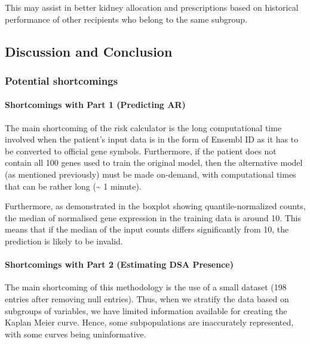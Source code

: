\documentclass[a4paper,9pt,twocolumn,twoside,]{pinp}
\begin{document}
This may assist in better kidney allocation and prescriptions based on
historical performance of other recipients who belong to the same
subgroup.

\newpage

\hypertarget{discussion-and-conclusion}{%
\subsection{Discussion and Conclusion}\label{discussion-and-conclusion}}

\hypertarget{potential-shortcomings}{%
\subsubsection{Potential shortcomings}\label{potential-shortcomings}}

\hypertarget{shortcomings-with-part-1-predicting-ar}{%
\paragraph{Shortcomings with Part 1 (Predicting
AR)}\label{shortcomings-with-part-1-predicting-ar}}

The main shortcoming of the risk calculator is the long computational
time involved when the patient's input data is in the form of Ensembl ID
as it has to be converted to official gene symbols. Furthermore, if the
patient does not contain all 100 genes used to train the original model,
then the alternative model (as mentioned previously) must be made
on-demand, with computational times that can be rather long
(\textasciitilde{} 1 minute).

Furthermore, as demonstrated in the boxplot showing quantile-normalized
counts, the median of normalised gene expression in the training data is
around 10. This means that if the median of the input counts differs
significantly from 10, the prediction is likely to be invalid.

\hypertarget{shortcomings-with-part-2-estimating-dsa-presence}{%
\paragraph{Shortcomings with Part 2 (Estimating DSA
Presence)}\label{shortcomings-with-part-2-estimating-dsa-presence}}

The main shortcoming of this methodology is the use of a small dataset
(198 entries after removing null entries). Thus, when we stratify the
data based on subgroups of variables, we have limited information
available for creating the Kaplan Meier curve. Hence, some
subpopulations are inaccurately represented, with some curves being
uninformative.
\end{document}
